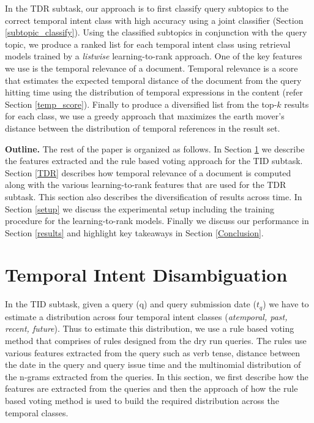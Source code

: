 \documentclass{sig-alternate}
\begin{document}
In the TDR subtask, our approach is to first classify query subtopics to the correct temporal intent class with high accuracy using a joint classifier (Section \ref{subtopic_classify}). Using the classified subtopics in conjunction with the query topic, we produce a ranked list for each temporal intent class using retrieval models trained by a \textit{listwise} learning-to-rank approach. One of the key features we use is the temporal relevance of a document. Temporal relevance is a score that estimates the expected temporal distance of the document from the query hitting time using the distribution of temporal expressions in the content (refer Section \ref{temp_score}). Finally to produce a diversified list from the top-$k$ results for each class, we use a greedy approach that maximizes the earth mover's distance between the distribution of temporal references in the result set.

\textbf{Outline.} The rest of the paper is organized as follows. In Section \ref{TID} we describe the features extracted and the rule based voting approach for the TID subtask. Section \ref{TDR} describes how temporal relevance of a document is computed along with the various learning-to-rank features that are used for the TDR subtask. This section also describes the diversification of results across time. In Section \ref{setup} we discuss the experimental setup including the training procedure for the learning-to-rank models. Finally we discuss our performance in Section \ref{results} and highlight key takeaways in Section \ref{Conclusion}.





\section{Temporal Intent Disambiguation}\label{TID}
In the TID subtask, given a query (q) and query submission date ($t_{q}$) we have to estimate a distribution across four temporal intent classes (\textit{atemporal, past, recent, future}). Thus to estimate this distribution, we use a rule based voting method that comprises of rules designed from the dry run queries. The rules use various features extracted from the query such as verb tense, distance between the date in the query and query issue time and the multinomial distribution of the n-grams extracted from the queries. In this section, we first describe how the features are extracted from the queries and then the approach of how the rule based voting method is used to build the required distribution across the temporal classes.
\end{document}
